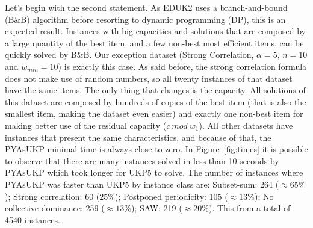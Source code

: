 \documentclass[runningheads,a4paper]{llncs}
\begin{document}
Let's begin with the second statement. As EDUK2 uses a branch-and-bound (B\&B) algorithm before resorting to dynamic programming (DP), this is an expected result. 
Instances with big capacities and solutions that are composed by a large quantity of the best item, and a few non-best most efficient items, can be quickly solved by B\&B.
Our exception dataset (Strong Correlation, \(\alpha = 5\), \(n = 10\) and \(w_{min} = 10\)) is exactly this case. As said before, the strong correlation formula does not make use of random numbers, so all twenty instances of that dataset have the same items. 
The only thing that changes is the capacity. All solutions of this dataset are composed by hundreds of copies of the best item (that is also the smallest item, making the dataset even easier) and exactly one non-best item for making better use of the residual capacity (\(c~mod~w_1\)). 
All other datasets have instances that present the same characteristics, and because of that, the PYAsUKP minimal time is always close to zero. In Figure~\ref{fig:times} it is possible to observe that there are many instances solved in less than 10 seconds by PYAsUKP which took longer for UKP5 to solve.
The number of instances where PYAsUKP was faster than UKP5 by instance class are: Subset-sum: 264 (\(\approx65\%\)); Strong correlation: 60 (\(25\%\)); Postponed periodicity: 105 (\(\approx13\%\)); No collective dominance: 259 (\(\approx13\%\)); SAW: 219 (\(\approx20\%\)). This from a total of 4540 instances.

\end{document}
